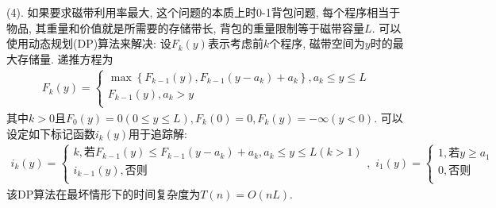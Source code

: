 \documentclass{article}
\begin{document}
\begin{homeworkProblem}
	(4). 如果要求磁带利用率最大, 这个问题的本质上时0-1背包问题, 每个程序相当于物品, 其重量和价值就是所需要的存储带长, 背包的重量限制等于磁带容量$L$. 可以使用动态规划(DP)算法来解决: 设$F_k\left( y \right) $表示考虑前$k$个程序, 磁带空间为$y$时的最大存储量. 递推方程为
	\begin{align}
		F_k\left( y \right) =\begin{cases}
			\max \left\{ F_{k-1}\left( y \right) ,F_{k-1}\left( y-a_k \right) +a_k \right\} , a_k\le y\le L\\
			F_{k-1}\left( y \right) , a_k>y\\
		\end{cases}
	\end{align}
	其中$k>0$且$F_0\left( y \right) =0 \left( 0\le y\le L \right) , F_k\left( 0 \right) =0, F_k\left( y \right) =-\infty \left( y<0 \right)$. 可以设定如下标记函数$i_k(y)$用于追踪解:
	\begin{align}
		i_k\left( y \right) =\begin{cases}
			k, \text{若}F_{k-1}\left( y \right) \le F_{k-1}\left( y-a_k \right) +a_k,a_k\le y\le L\left( k>1 \right)\\
			i_{k-1}\left( y \right) , \text{否则}\\
		\end{cases},\,\, i_1\left( y \right) =\begin{cases}
			1, \text{若}y\ge a_1\\
			0, \text{否则}\\
		\end{cases}
	\end{align}
	该DP算法在最坏情形下的时间复杂度为$T(n)=O(nL)$.
\end{homeworkProblem}



\pagebreak
\end{document}
